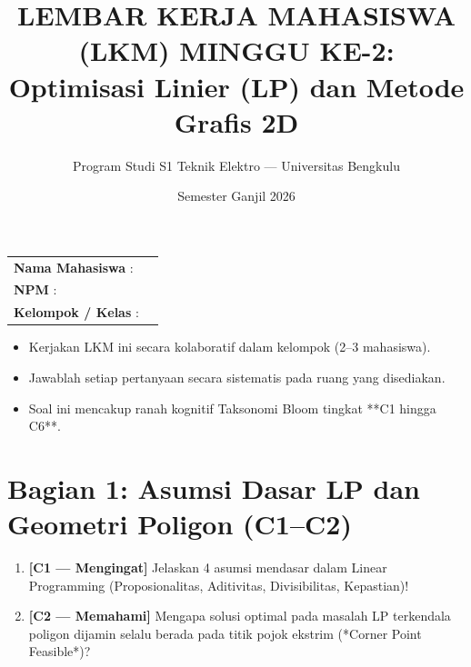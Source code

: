 \documentclass[11pt,a4paper]{article}
\title{\vspace{-1cm}\textbf{LEMBAR KERJA MAHASISWA (LKM) MINGGU KE-2:}\\Optimisasi Linier (LP) dan Metode Grafis 2D}
\author{Program Studi S1 Teknik Elektro --- Universitas Bengkulu}
\date{Semester Ganjil 2026}
\begin{document}
\maketitle

\begin{tcolorbox}[colback=unibblue!5,colframe=unibblue,title=\textbf{Identitas Mahasiswa dan Instruksi}]
\begin{tabular}{ll}
\textbf{Nama Mahasiswa} : & \hrulefill\hspace{6cm} \\
\textbf{NPM} : & \hrulefill\hspace{6cm} \\
\textbf{Kelompok / Kelas} : & \hrulefill\hspace{6cm} \\
\end{tabular}
\vspace{0.2cm}
\begin{itemize}[leftmargin=*]
    \item Kerjakan LKM ini secara kolaboratif dalam kelompok (2--3 mahasiswa).
    \item Jawablah setiap pertanyaan secara sistematis pada ruang yang disediakan.
    \item Soal ini mencakup ranah kognitif Taksonomi Bloom tingkat **C1 hingga C6**.
\end{itemize}
\end{tcolorbox}

\vspace{0.3cm}

\section*{Bagian 1: Asumsi Dasar LP dan Geometri Poligon (C1--C2)}

\begin{enumerate}[label=\textbf{Soal \arabic*:}, leftmargin=*]
    \item \textbf{[C1 --- Mengingat]} Jelaskan 4 asumsi mendasar dalam Linear Programming (Proposionalitas, Aditivitas, Divisibilitas, Kepastian)!
    
    \begin{tcolorbox}[colback=white,colframe=gray!50,height=3.5cm,title=Ruang Jawaban Soal 1]
    \end{tcolorbox}

    \item \textbf{[C2 --- Memahami]} Mengapa solusi optimal pada masalah LP terkendala poligon dijamin selalu berada pada titik pojok ekstrim (*Corner Point Feasible*)?
    
    \begin{tcolorbox}[colback=white,colframe=gray!50,height=3.5cm,title=Ruang Jawaban Soal 2]
    \end{tcolorbox}
\end{enumerate}
\end{document}
